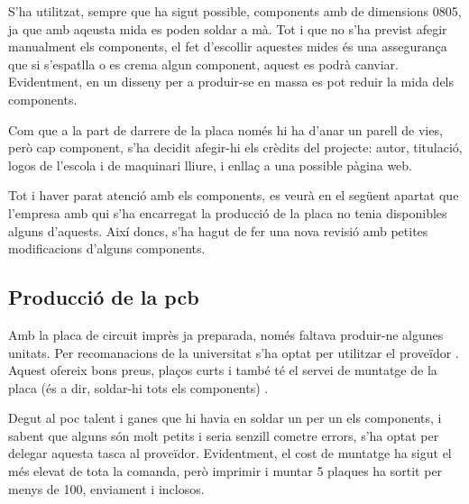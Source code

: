 S'ha utilitzat,
sempre que ha sigut possible, components amb  de dimensions 0805,
ja que amb aqeusta mida es poden soldar a mà. Tot i que no s'ha previst afegir
manualment els components, el fet d'escollir aquestes mides és una assegurança
que si s'espatlla o es crema algun component, aquest es podrà canviar.
Evidentment, en un disseny per a produir-se en massa es pot reduir la mida dels
components.

Com que a la part de darrere de la placa només hi ha d'anar un parell de vies,
però cap component, s'ha decidit afegir-hi els crèdits del projecte: autor,
titulació, logos de l'escola i de maquinari lliure, i enllaç a una possible
pàgina web.

Tot i haver parat atenció amb els components, es veurà en el següent apartat que
l'empresa amb qui s'ha encarregat la producció de la placa no tenia disponibles
alguns d'aquests. Així doncs, s'ha hagut de fer una nova revisió amb petites
modificacions d'alguns components.

\subsection{Producció de la pcb}

Amb la placa de circuit imprès ja preparada, només faltava produir-ne algunes
unitats. Per recomanacions de la universitat s'ha optat per utilitzar el
proveïdor . Aquest ofereix bons preus, plaços curts i també té el
servei de muntatge de la placa (és a dir, soldar-hi tots els components)
\cite{JlcPcb}.

Degut al poc talent i ganes que hi havia en soldar un per un els components, i
sabent que alguns són molt petits i seria senzill cometre errors, s'ha optat
per delegar aquesta tasca al proveïdor. Evidentment, el cost de muntatge ha
sigut el més elevat de tota la comanda, però imprimir i muntar 5 plaques
ha sortit per menys de \SI[round-mode=places,round-precision=0]{100}{\EUR},
enviament i  inclosos.

